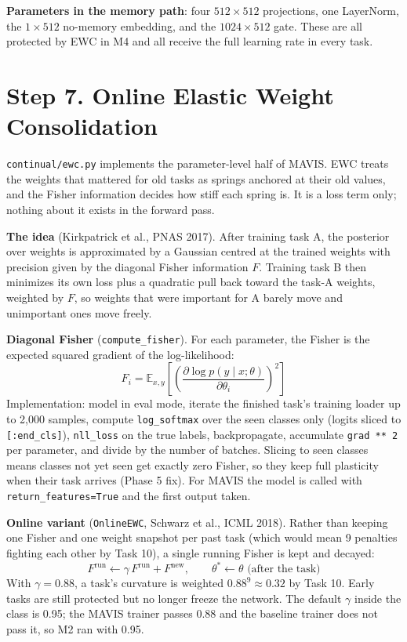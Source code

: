 \documentclass[11pt,a4paper]{article}
\newcommand{\code}[1]{\texttt{#1}}
\begin{document}
\textbf{Parameters in the memory path}: four $512 \times 512$ projections, one LayerNorm, the $1 \times 512$ no-memory embedding, and the $1024 \times 512$ gate. These are all protected by EWC in M4 and all receive the full learning rate in every task.

\section{Step 7. Online Elastic Weight Consolidation}

\code{continual/ewc.py} implements the parameter-level half of MAVIS. EWC treats the weights that mattered for old tasks as springs anchored at their old values, and the Fisher information decides how stiff each spring is. It is a loss term only; nothing about it exists in the forward pass.

\textbf{The idea} (Kirkpatrick et al., PNAS 2017). After training task A, the posterior over weights is approximated by a Gaussian centred at the trained weights with precision given by the diagonal Fisher information $F$. Training task B then minimizes its own loss plus a quadratic pull back toward the task-A weights, weighted by $F$, so weights that were important for A barely move and unimportant ones move freely.

\textbf{Diagonal Fisher} (\code{compute\_fisher}). For each parameter, the Fisher is the expected squared gradient of the log-likelihood:
\begin{equation}
F_i = \mathbb{E}_{x,y}\left[\left(\frac{\partial \log p(y \mid x;\theta)}{\partial \theta_i}\right)^2\right]
\end{equation}
Implementation: model in eval mode, iterate the finished task's training loader up to 2{,}000 samples, compute \code{log\_softmax} over the seen classes only (logits sliced to \code{[:end\_cls]}), \code{nll\_loss} on the true labels, backpropagate, accumulate \code{grad ** 2} per parameter, and divide by the number of batches. Slicing to seen classes means classes not yet seen get exactly zero Fisher, so they keep full plasticity when their task arrives (Phase 5 fix). For MAVIS the model is called with \code{return\_features=True} and the first output taken.

\textbf{Online variant} (\code{OnlineEWC}, Schwarz et al., ICML 2018). Rather than keeping one Fisher and one weight snapshot per past task (which would mean 9 penalties fighting each other by Task 10), a single running Fisher is kept and decayed:
\begin{equation}
F^{\mathrm{run}} \leftarrow \gamma\, F^{\mathrm{run}} + F^{\mathrm{new}}, \qquad \theta^{*} \leftarrow \theta \text{ (after the task)}
\end{equation}
With $\gamma = 0.88$, a task's curvature is weighted $0.88^9 \approx 0.32$ by Task 10. Early tasks are still protected but no longer freeze the network. The default $\gamma$ inside the class is 0.95; the MAVIS trainer passes 0.88 and the baseline trainer does not pass it, so M2 ran with 0.95.
\end{document}
